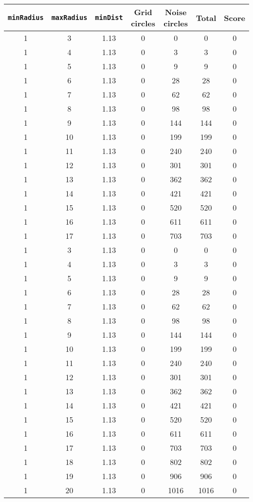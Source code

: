 \documentclass[letterpaper, 12pt]{article}
\begin{document}
\begin{longtable}{|c|c|c|c|c|c|c|}
\hline
\textbf{\texttt{minRadius}} & \textbf{\texttt{maxRadius}} & \textbf{\texttt{minDist}} & \textbf{Grid circles} & \textbf{Noise circles} & \textbf{Total} & \textbf{Score} \\
\hline
1 & 3 & 1.13 & 0 & 0 & 0 & 0 \\
\hline
1 & 4 & 1.13 & 0 & 3 & 3 & 0 \\
\hline
1 & 5 & 1.13 & 0 & 9 & 9 & 0 \\
\hline
1 & 6 & 1.13 & 0 & 28 & 28 & 0 \\
\hline
1 & 7 & 1.13 & 0 & 62 & 62 & 0 \\
\hline
1 & 8 & 1.13 & 0 & 98 & 98 & 0 \\
\hline
1 & 9 & 1.13 & 0 & 144 & 144 & 0 \\
\hline
1 & 10 & 1.13 & 0 & 199 & 199 & 0 \\
\hline
1 & 11 & 1.13 & 0 & 240 & 240 & 0 \\
\hline
1 & 12 & 1.13 & 0 & 301 & 301 & 0 \\
\hline
1 & 13 & 1.13 & 0 & 362 & 362 & 0 \\
\hline
1 & 14 & 1.13 & 0 & 421 & 421 & 0 \\
\hline
1 & 15 & 1.13 & 0 & 520 & 520 & 0 \\
\hline
1 & 16 & 1.13 & 0 & 611 & 611 & 0 \\
\hline
1 & 17 & 1.13 & 0 & 703 & 703 & 0 \\
\hline
1 & 3 & 1.13 & 0 & 0 & 0 & 0 \\
\hline
1 & 4 & 1.13 & 0 & 3 & 3 & 0 \\
\hline
1 & 5 & 1.13 & 0 & 9 & 9 & 0 \\
\hline
1 & 6 & 1.13 & 0 & 28 & 28 & 0 \\
\hline
1 & 7 & 1.13 & 0 & 62 & 62 & 0 \\
\hline
1 & 8 & 1.13 & 0 & 98 & 98 & 0 \\
\hline
1 & 9 & 1.13 & 0 & 144 & 144 & 0 \\
\hline
1 & 10 & 1.13 & 0 & 199 & 199 & 0 \\
\hline
1 & 11 & 1.13 & 0 & 240 & 240 & 0 \\
\hline
1 & 12 & 1.13 & 0 & 301 & 301 & 0 \\
\hline
1 & 13 & 1.13 & 0 & 362 & 362 & 0 \\
\hline
1 & 14 & 1.13 & 0 & 421 & 421 & 0 \\
\hline
1 & 15 & 1.13 & 0 & 520 & 520 & 0 \\
\hline
1 & 16 & 1.13 & 0 & 611 & 611 & 0 \\
\hline
1 & 17 & 1.13 & 0 & 703 & 703 & 0 \\
\hline
1 & 18 & 1.13 & 0 & 802 & 802 & 0 \\
\hline
1 & 19 & 1.13 & 0 & 906 & 906 & 0 \\
\hline
1 & 20 & 1.13 & 0 & 1016 & 1016 & 0 \\
\hline
\end{longtable}
\end{document}
